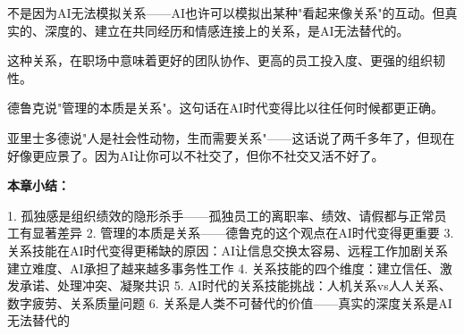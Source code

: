 不是因为AI无法模拟关系——AI也许可以模拟出某种"看起来像关系"的互动。但真实的、深度的、建立在共同经历和情感连接上的关系，是AI无法替代的。

这种关系，在职场中意味着更好的团队协作、更高的员工投入度、更强的组织韧性。

德鲁克说"管理的本质是关系"。这句话在AI时代变得比以往任何时候都更正确。

亚里士多德说"人是社会性动物，生而需要关系"——这话说了两千多年了，但现在好像更应景了。因为AI让你可以不社交了，但你不社交又活不好了。


\textbf{本章小结：}

1. 孤独感是组织绩效的隐形杀手——孤独员工的离职率、绩效、请假都与正常员工有显著差异
2. 管理的本质是关系——德鲁克的这个观点在AI时代变得更重要
3. 关系技能在AI时代变得更稀缺的原因：AI让信息交换太容易、远程工作加剧关系建立难度、AI承担了越来越多事务性工作
4. 关系技能的四个维度：建立信任、激发承诺、处理冲突、凝聚共识
5. AI时代的关系技能挑战：人机关系vs人人关系、数字疲劳、关系质量问题
6. 关系是人类不可替代的价值——真实的深度关系是AI无法替代的
